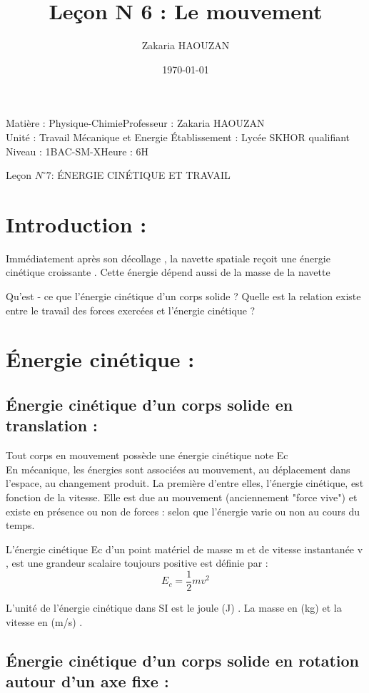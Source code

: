 \documentclass[12pt]{article}
\title{Leçon N 6 : Le mouvement}
\author{Zakaria HAOUZAN}
\date{\today}
\newcommand\headerMe[2]{\noindent{}#1\hfill#2}
\begin{document}
\headerMe{Matière : Physique-Chimie}{Professeur : Zakaria HAOUZAN}\\
\headerMe{Unité : Travail Mécanique et Energie }{Établissement : Lycée SKHOR qualifiant}\\
\headerMe{Niveau : 1BAC-SM-X}{Heure : 6H}\\

\begin{center}

    \Large{Leçon $N^{\circ} 7 $: \color{red} ÉNERGIE CINÉTIQUE ET TRAVAIL}
\end{center}
\section{ Introduction : }
Immédiatement après son décollage , la navette spatiale reçoit une énergie cinétique croissante . Cette énergie dépend aussi de la
masse de la navette

Qu’est - ce que l’énergie cinétique d’un corps solide ? Quelle est
la relation existe entre le travail des forces exercées et l’énergie
cinétique ?
\section{Énergie cinétique : }
\subsection {Énergie cinétique d’un corps solide en translation  : }

Tout corps en mouvement possède une énergie cinétique note Ec
\\En mécanique, les énergies sont associées au mouvement, au déplacement dans l'espace, au changement produit.
La première d'entre elles, l'énergie cinétique, est fonction de la vitesse.
Elle est due au mouvement (anciennement "force vive") et existe en présence ou non de forces : selon que l'énergie varie ou non au cours du temps.

L’énergie cinétique Ec d’un point matériel de masse m et de vitesse instantanée v , est une grandeur scalaire toujours positive est définie par : $$E_c  = \frac{1}{2}mv^2$$

L’unité de l’énergie cinétique dans SI est le joule (J) .
La masse en (kg) et la vitesse en (m/s) .


\subsection{Énergie cinétique d’un corps solide en rotation autour d’un axe fixe  :}
\end{document}
